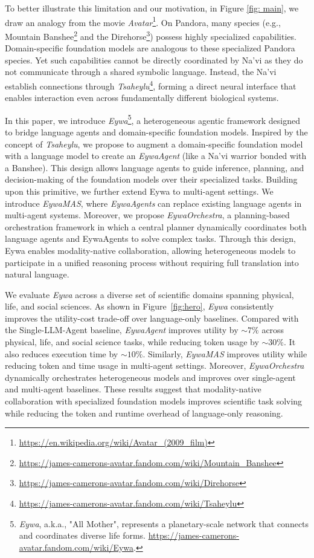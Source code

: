 \documentclass{llmxive}
\begin{document}
{To better illustrate this limitation and our motivation, in Figure \ref{fig: main}, we draw an analogy from the movie \textit{Avatar}\footnote{\url{https://en.wikipedia.org/wiki/Avatar_(2009_film)}}. On Pandora, many species (e.g., Mountain Banshee\footnote{\url{https://james-camerons-avatar.fandom.com/wiki/Mountain_Banshee}} and the Direhorse\footnote{\url{https://james-camerons-avatar.fandom.com/wiki/Direhorse}}) possess highly specialized capabilities. Domain-specific foundation models are analogous to these specialized Pandora species. 
Yet such capabilities cannot be directly coordinated by Na'vi as they do not communicate through a shared symbolic language.
Instead, the Na'vi establish connections through \textit{Tsaheylu}\footnote{\url{https://james-camerons-avatar.fandom.com/wiki/Tsaheylu}}, forming a direct neural interface that enables interaction even across fundamentally different biological systems.

In this paper, we introduce \textit{Eywa}\footnote{\textit{Eywa}, a.k.a., "All Mother", represents a planetary-scale network that connects and coordinates diverse life forms. \url{https://james-camerons-avatar.fandom.com/wiki/Eywa}.}, a heterogeneous agentic framework designed to bridge language agents and domain-specific foundation models.
Inspired by the concept of \textit{Tsaheylu}, we propose to augment a domain-specific foundation model with a language model to create an \textit{EywaAgent} (like a Na'vi warrior bonded with a Banshee). This design allows language agents to guide inference, planning, and decision-making of the foundation models over their specialized tasks.
Building upon this primitive, we further extend Eywa to multi-agent settings. 
We introduce \textit{EywaMAS}, where \textit{EywaAgents} can replace existing language agents in multi-agent systems. 
Moreover, we propose \textit{EywaOrchestra}, a planning-based orchestration framework in which a central planner dynamically coordinates both language agents and EywaAgents to solve complex tasks. 
Through this design, Eywa enables modality-native collaboration, allowing heterogeneous models to participate in a unified reasoning process without requiring full translation into natural language.

We evaluate \textit{Eywa} across a diverse set of scientific domains spanning physical, life, and social sciences.
As shown in Figure~\ref{fig:hero}, \textit{Eywa} consistently improves the utility-cost trade-off over language-only baselines. 
Compared with the Single-LLM-Agent baseline, \textit{EywaAgent} improves utility by $\sim7\%$ across physical, life, and social science tasks, while reducing token usage by $\sim30\%$.
It also reduces execution time by $\sim10\%$.
Similarly, \textit{EywaMAS} improves utility while reducing token and time usage in multi-agent settings. Moreover, \textit{EywaOrchestra} dynamically orchestrates heterogeneous models and improves over single-agent and multi-agent baselines.
These results suggest that modality-native collaboration with specialized foundation models improves scientific task solving while reducing the token and runtime overhead of language-only reasoning. 

}
\end{document}
